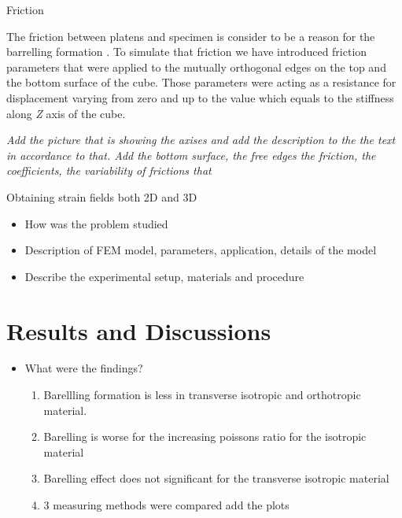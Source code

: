 \documentclass[review]{elsarticle}
\begin{document}
\begin{description}
\item[{\color {red}Friction}]
\end{description}

The friction between platens and specimen is consider to be a reason for the
barrelling formation \cite{Narayanasamy198821, kulkarni1969}.  To simulate that
friction we have introduced friction parameters that were applied to the mutually orthogonal
edges on the top and the bottom surface of the cube. Those parameters were
acting as a resistance for displacement varying from zero and up to the value
which equals to the stiffness along \textit{Z} axis of the cube.

\textit{\color {red}Add the picture that is showing the axises and add the
description to the the text in accordance to that. Add the bottom surface, the
free edges the friction, the coefficients, the variability of frictions that }

\begin{description}
\item[{\color {red}Obtaining strain fields both 2D and 3D}]
\end{description}

\begin{itemize}
\color{red}
\item How was the problem studied 
\item Description of FEM model, parameters, application, details of the model
\item Describe the experimental setup, materials and procedure
\end{itemize}


\section{Results and Discussions}
\begin{itemize}
\color{red}
\item What were the findings?

	\begin{enumerate}
	\color{black}
		\item Barellling formation is less in transverse isotropic and orthotropic
		material.
		\item Barelling is worse for the increasing poissons ratio for the isotropic
		material
		\item Barelling effect does not significant for the transverse isotropic
		material
		\item 3 measuring methods were compared {\color{red} add the plots}
	\end{enumerate}
\end{itemize}
\end{document}

